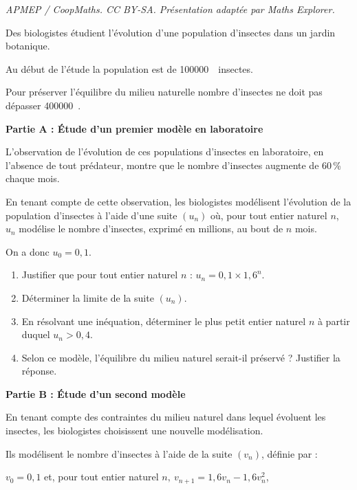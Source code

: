 \documentclass[10pt]{article}
\providecommand{\np}[2][]{{#2~#1}}
\begin{document}
\noindent\textit{APMEP / CoopMaths. CC BY-SA. Présentation adaptée par Maths Explorer.}\par\medskip
\medskip

Des biologistes étudient l'évolution d'une population d'insectes dans un jardin botanique. 

Au début de l'étude la population est de \np{100000}~insectes.

Pour préserver l'équilibre du milieu naturelle nombre d'insectes ne doit pas dépasser \np{400000}.

\bigskip

\textbf{Partie A : Étude d'un premier modèle en laboratoire}

\medskip

L'observation de l'évolution de ces populations d'insectes en laboratoire, en l'absence de tout prédateur, montre que le nombre d'insectes augmente de 60\,\% chaque mois.

En tenant compte de cette observation, les biologistes modélisent l'évolution de la population d'insectes à l'aide d'une suite $\left(u_n\right)$ où, pour tout entier naturel $n$, \: $u_n$ modélise le nombre d'insectes, exprimé en millions, au bout de $n$ mois. 

On a donc $u_0 = 0,1$.

\medskip

\begin{enumerate}
\item Justifier que pour tout entier naturel $n$ : \:$u_n = 0,1 \times 1,6^n$.
\item Déterminer la limite de la suite $\left(u_n\right)$.
\item En résolvant une inéquation, déterminer le plus petit entier naturel $n$ à partir duquel $u_n > 0,4$.
\item Selon ce modèle, l'équilibre du milieu naturel serait-il préservé ? Justifier la réponse.
\end{enumerate}

\bigskip

\textbf{Partie B : Étude d'un second modèle}

\medskip

En tenant compte des contraintes du milieu naturel dans lequel évoluent les insectes, les biologistes choisissent une nouvelle modélisation.

Ils modélisent le nombre d'insectes à l'aide de la suite $\left(v_n\right)$, définie par :

\begin{center}$v_0 = 0,1$ \quad et, pour tout entier naturel $n,\: v_{n+1} = 1,6v_n - 1,6v_n^2$,\end{center}
\end{document}
